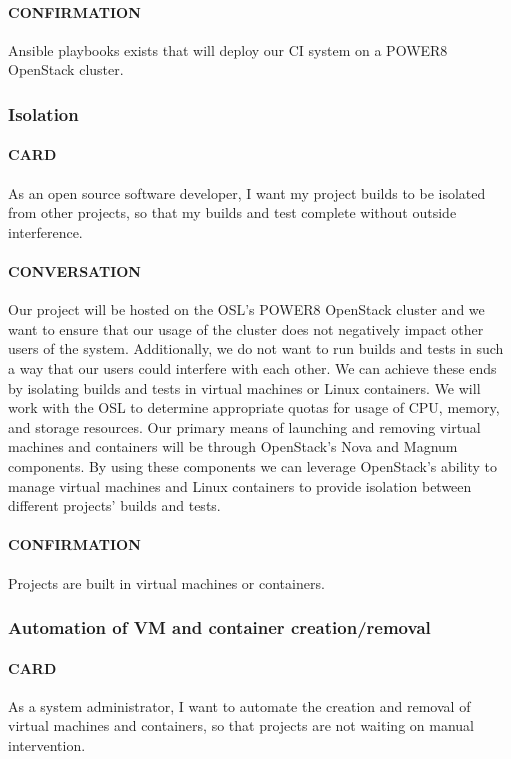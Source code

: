 \documentclass[10pt,letterpaper,onecolumn,draftclsnofoot]{IEEEtran}
\begin{document}
\paragraph{CONFIRMATION}
Ansible playbooks exists that will deploy our CI system on a POWER8 OpenStack cluster.

\subsubsection{Isolation}
\paragraph{CARD}
As an open source software developer, I want my project builds to be isolated from other projects, so that my builds and test complete without outside interference.
\paragraph{CONVERSATION}
Our project will be hosted on the OSL's POWER8 OpenStack cluster and we want to ensure that our usage of the cluster does not negatively impact other users of the system.
Additionally, we do not want to run builds and tests in such a way that our users could interfere with each other.
We can achieve these ends by isolating builds and tests in virtual machines or Linux containers.
We will work with the OSL to determine appropriate quotas for usage of CPU, memory, and storage resources.
Our primary means of launching and removing virtual machines and containers will be through OpenStack's Nova and Magnum components.
By using these components we can leverage OpenStack's ability to manage virtual machines and Linux containers to provide isolation between different projects' builds and tests.
\paragraph{CONFIRMATION}
Projects are built in virtual machines or containers.
\subsubsection{Automation of VM and container creation/removal}
\paragraph{CARD}
As a system administrator, I want to automate the creation and removal of virtual machines and containers, so that projects are not waiting on manual intervention.
\end{document}
